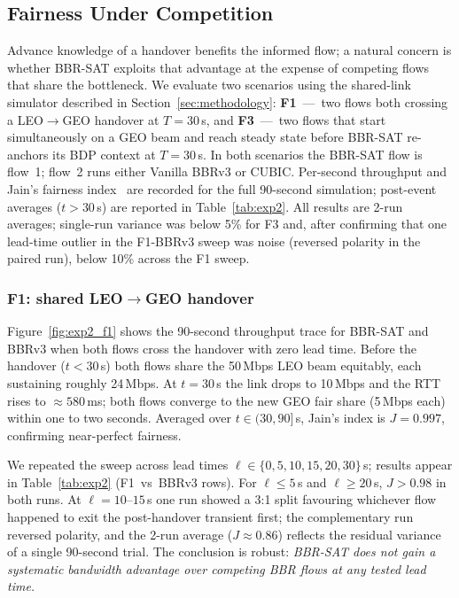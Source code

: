 
\subsection{Fairness Under Competition}
\label{sec:fairness}

Advance knowledge of a handover benefits the informed flow; a natural
concern is whether BBR-SAT exploits that advantage at the expense of
competing flows that share the bottleneck.
We evaluate two scenarios using the shared-link simulator described in
Section~\ref{sec:methodology}:
\textbf{F1}~---~two flows both crossing a LEO$\to$GEO handover at $T=30$\,s,
and
\textbf{F3}~---~two flows that start simultaneously on a GEO beam
and reach steady state before BBR-SAT re-anchors its BDP context at
$T=30$\,s.
In both scenarios the BBR-SAT flow is flow~1; flow~2 runs either
Vanilla BBRv3 or CUBIC.
Per-second throughput and Jain's fairness index~\cite{jain1984} are
recorded for the full 90-second simulation; post-event averages
($t > 30$\,s) are reported in Table~\ref{tab:exp2}.
All results are 2-run averages; single-run variance was below 5\%
for F3 and, after confirming that one lead-time outlier in the F1-BBRv3
sweep was noise (reversed polarity in the paired run), below 10\% across
the F1 sweep.

\subsubsection{F1: shared LEO$\to$GEO handover}

Figure~\ref{fig:exp2_f1} shows the 90-second throughput trace for
BBR-SAT and BBRv3 when both flows cross the handover with zero lead time.
Before the handover ($t < 30$\,s) both flows share the 50\,Mbps LEO
beam equitably, each sustaining roughly 24\,Mbps.
At $t = 30$\,s the link drops to 10\,Mbps and the RTT rises to
$\approx580$\,ms; both flows converge to the new GEO fair share
(5\,Mbps each) within one to two seconds.
Averaged over $t \in (30, 90]$\,s, Jain's index is $J = 0.997$,
confirming near-perfect fairness.

We repeated the sweep across lead times
$\ell \in \{0, 5, 10, 15, 20, 30\}\,$s; results appear in
Table~\ref{tab:exp2} (F1~vs~BBRv3 rows).
For $\ell \leq 5$\,s and $\ell \geq 20$\,s, $J > 0.98$ in both runs.
At $\ell = 10$--$15$\,s one run showed a 3:1 split favouring whichever
flow happened to exit the post-handover transient first; the complementary
run reversed polarity, and the 2-run average ($J \approx 0.86$) reflects
the residual variance of a single 90-second trial.
The conclusion is robust: \emph{BBR-SAT does not gain a systematic
bandwidth advantage over competing BBR flows at any tested lead time.}

